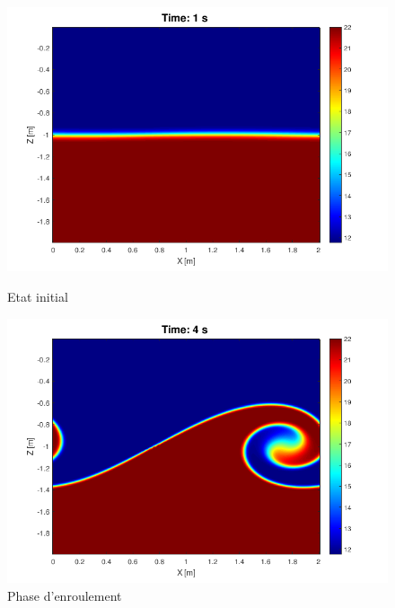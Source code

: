 \documentclass{rapportECC}
\begin{document}
\begin{figure}[htbp] %
    \centering
    \begin{minipage}{0.45\textwidth}
        \centering
        \includegraphics[width=\linewidth]{images/KHI1.png}
        \caption{Etat initial}
        \label{fig:KHI1}
    \end{minipage}
    \hspace{0.05\textwidth} %
    \begin{minipage}{0.45\textwidth}
        \centering
        \includegraphics[width=\linewidth]{images/KHI2.png}
        \caption{Phase d'enroulement}
        \label{fig:KHI2}
    \end{minipage}

\end{figure}
\end{document}
